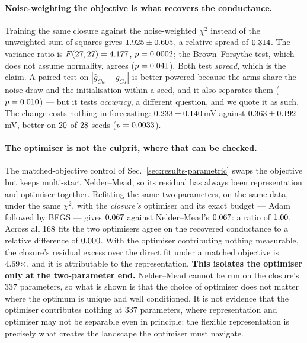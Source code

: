 \documentclass{article}
\newcommand{\NparamUde}{337}   %
\begin{document}
\paragraph{Noise-weighting the objective is what recovers the conductance.}
Training the same closure against the noise-weighted $\chi^2$ instead of the
unweighted sum of squares gives $1.925 \pm 0.605$, a
relative spread of $0.314$. The variance ratio is
$F(27,27) = 4.177$, $p = 0.0002$; the Brown--Forsythe test,
which does not assume normality, agrees ($p = 0.041$). Both test
\emph{spread}, which is the claim. A paired test on $|\hat{g}_{Ca} - g_{Ca}|$ is
better powered because the arms share the noise draw and the initialisation
within a seed, and it also separates them ($p = 0.010$) --- but it tests
\emph{accuracy}, a different question, and we quote it as such. The change costs
nothing in forecasting: $0.233 \pm 0.140$\,mV against
$0.363 \pm 0.192$\,mV, better on $20$ of
$28$ seeds ($p = 0.0033$).

\paragraph{The optimiser is not the culprit, where that can be checked.}
The matched-objective control of Sec.~\ref{sec:results-parametric} swaps the
objective but keeps multi-start Nelder--Mead, so its residual has always been
representation and optimiser together. Refitting the same two parameters, on the
same data, under the same $\chi^2$, with the \emph{closure's} optimiser and its
exact budget --- Adam followed by BFGS --- gives $0.067$ against
Nelder--Mead's $0.067$: a ratio of $1.00$. Across all
$168$ fits the two optimisers agree on the recovered conductance to a
relative difference of $0.000$. With the optimiser contributing
nothing measurable, the closure's residual excess over the direct fit under a
matched objective is $4.69\times$, and it is attributable to the
representation. \textbf{This isolates the optimiser only at the two-parameter
end.} Nelder--Mead cannot be run on the closure's $\NparamUde$ parameters,
so what is shown is that the choice of optimiser does not matter where the
optimum is unique and well conditioned. It is not evidence that the optimiser
contributes nothing at $\NparamUde$ parameters, where representation and
optimiser may not be separable even in principle: the flexible representation is
precisely what creates the landscape the optimiser must navigate.
\end{document}

